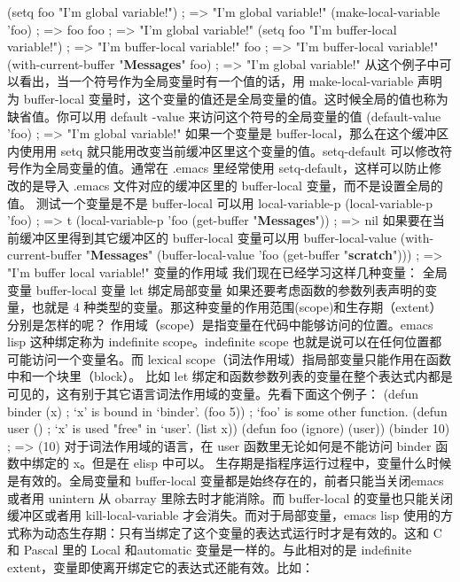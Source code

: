 \documentclass[11pt]{ctexart}
\begin{document}
\begin{SCR}
(setq foo "I'm global variable!")       ; => "I'm global variable!"
(make-local-variable 'foo)              ; => foo
foo                                     ; => "I'm global variable!"
(setq foo "I'm buffer-local variable!") ; => "I'm buffer-local variable!"
foo                                  ; => "I'm buffer-local variable!"
(with-current-buffer "\textbf{Messages}" foo)  ; => "I'm global variable!"
从这个例子中可以看出，当一个符号作为全局变量时有一个值的话，用 make-local-variable 声明为 buffer-local 变量时，这个变量的值还是全局变量的值。这时候全局的值也称为缺省值。你可以用 default -value 来访问这个符号的全局变量的值
(default-value 'foo)                    ; => "I'm global variable!"
如果一个变量是 buffer-local，那么在这个缓冲区内使用用 setq 就只能用改变当前缓冲区里这个变量的值。setq-default 可以修改符号作为全局变量的值。通常在 .emacs 里经常使用 setq-default，这样可以防止修改的是导入 .emacs 文件对应的缓冲区里的 buffer-local 变量，而不是设置全局的值。
测试一个变量是不是 buffer-local 可以用 local-variable-p
(local-variable-p 'foo)                           ; => t
(local-variable-p 'foo (get-buffer "\textbf{Messages}")) ; => nil
如果要在当前缓冲区里得到其它缓冲区的 buffer-local 变量可以用 buffer-local-value
(with-current-buffer "\textbf{Messages}"
(buffer-local-value 'foo (get-buffer "\textbf{scratch}")))
; => "I'm buffer local variable!"
变量的作用域
我们现在已经学习这样几种变量：
全局变量
buffer-local 变量
let 绑定局部变量
如果还要考虑函数的参数列表声明的变量，也就是 4 种类型的变量。那这种变量的作用范围(scope)和生存期（extent）分别是怎样的呢？
作用域（scope）是指变量在代码中能够访问的位置。emacs lisp 这种绑定称为 indefinite scope。indefinite scope 也就是说可以在任何位置都可能访问一个变量名。而 lexical scope（词法作用域）指局部变量只能作用在函数中和一个块里（block）。
比如 let 绑定和函数参数列表的变量在整个表达式内都是可见的，这有别于其它语言词法作用域的变量。先看下面这个例子：
(defun binder (x)                      ; `x' is bound in `binder'.
(foo 5))                             ; `foo' is some other function.
(defun user ()                         ; `x' is used "free" in `user'.
(list x))
(defun foo (ignore)
(user))
(binder 10)                            ; => (10)
对于词法作用域的语言，在 user 函数里无论如何是不能访问 binder 函数中绑定的 x。但是在 elisp 中可以。
生存期是指程序运行过程中，变量什么时候是有效的。全局变量和 buffer-local 变量都是始终存在的，前者只能当关闭emacs 或者用 unintern 从 obarray 里除去时才能消除。而 buffer-local 的变量也只能关闭缓冲区或者用 kill-local-variable 才会消失。而对于局部变量，emacs lisp 使用的方式称为动态生存期：只有当绑定了这个变量的表达式运行时才是有效的。这和 C 和 Pascal 里的 Local 和automatic 变量是一样的。与此相对的是 indefinite extent，变量即使离开绑定它的表达式还能有效。比如：

\end{SCR}
\end{document}
